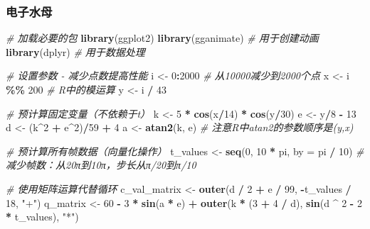 \documentclass[
  twoside]{book}
\newenvironment{Shaded}{\begin{snugshade}}{\end{snugshade}}
\newcommand{\AttributeTok}[1]{\textcolor[rgb]{0.13,0.29,0.53}{#1}}
\newcommand{\CommentTok}[1]{\textcolor[rgb]{0.56,0.35,0.01}{\textit{#1}}}
\newcommand{\DecValTok}[1]{\textcolor[rgb]{0.00,0.00,0.81}{#1}}
\newcommand{\FunctionTok}[1]{\textcolor[rgb]{0.13,0.29,0.53}{\textbf{#1}}}
\newcommand{\NormalTok}[1]{#1}
\newcommand{\OtherTok}[1]{\textcolor[rgb]{0.56,0.35,0.01}{#1}}
\newcommand{\SpecialCharTok}[1]{\textcolor[rgb]{0.81,0.36,0.00}{\textbf{#1}}}
\newcommand{\StringTok}[1]{\textcolor[rgb]{0.31,0.60,0.02}{#1}}
\begin{document}
\hypertarget{ux7535ux5b50ux6c34ux6bcd}{%
\subsubsection{电子水母}\label{ux7535ux5b50ux6c34ux6bcd}}

\begin{Shaded}
\begin{Highlighting}[]
\CommentTok{\# 加载必要的包}
\FunctionTok{library}\NormalTok{(ggplot2)}
\FunctionTok{library}\NormalTok{(gganimate) }\CommentTok{\# 用于创建动画}
\FunctionTok{library}\NormalTok{(dplyr)     }\CommentTok{\# 用于数据处理}

\CommentTok{\# 设置参数 {-} 减少点数提高性能}
\NormalTok{i }\OtherTok{\textless{}{-}} \DecValTok{0}\SpecialCharTok{:}\DecValTok{2000}  \CommentTok{\# 从10000减少到2000个点}
\NormalTok{x }\OtherTok{\textless{}{-}}\NormalTok{ i }\SpecialCharTok{\%\%} \DecValTok{200}      \CommentTok{\# R中的模运算}
\NormalTok{y }\OtherTok{\textless{}{-}}\NormalTok{ i }\SpecialCharTok{/} \DecValTok{43}

\CommentTok{\# 预计算固定变量（不依赖于t）}
\NormalTok{k }\OtherTok{\textless{}{-}} \DecValTok{5} \SpecialCharTok{*} \FunctionTok{cos}\NormalTok{(x}\SpecialCharTok{/}\DecValTok{14}\NormalTok{) }\SpecialCharTok{*} \FunctionTok{cos}\NormalTok{(y}\SpecialCharTok{/}\DecValTok{30}\NormalTok{)}
\NormalTok{e }\OtherTok{\textless{}{-}}\NormalTok{ y}\SpecialCharTok{/}\DecValTok{8} \SpecialCharTok{{-}} \DecValTok{13}
\NormalTok{d }\OtherTok{\textless{}{-}}\NormalTok{ (k}\SpecialCharTok{\^{}}\DecValTok{2} \SpecialCharTok{+}\NormalTok{ e}\SpecialCharTok{\^{}}\DecValTok{2}\NormalTok{)}\SpecialCharTok{/}\DecValTok{59} \SpecialCharTok{+} \DecValTok{4}
\NormalTok{a }\OtherTok{\textless{}{-}} \FunctionTok{atan2}\NormalTok{(k, e)   }\CommentTok{\# 注意R中atan2的参数顺序是(y,x)}

\CommentTok{\# 预计算所有帧数据（向量化操作）}
\NormalTok{t\_values }\OtherTok{\textless{}{-}} \FunctionTok{seq}\NormalTok{(}\DecValTok{0}\NormalTok{, }\DecValTok{10} \SpecialCharTok{*}\NormalTok{ pi, }\AttributeTok{by =}\NormalTok{ pi }\SpecialCharTok{/} \DecValTok{10}\NormalTok{)  }\CommentTok{\# 减少帧数：从20π到10π，步长从π/20到π/10}

\CommentTok{\# 使用矩阵运算代替循环}
\NormalTok{c\_val\_matrix }\OtherTok{\textless{}{-}} \FunctionTok{outer}\NormalTok{(d }\SpecialCharTok{/} \DecValTok{2} \SpecialCharTok{+}\NormalTok{ e }\SpecialCharTok{/} \DecValTok{99}\NormalTok{, }\SpecialCharTok{{-}}\NormalTok{t\_values }\SpecialCharTok{/} \DecValTok{18}\NormalTok{, }\StringTok{"+"}\NormalTok{)}
\NormalTok{q\_matrix }\OtherTok{\textless{}{-}} \DecValTok{60} \SpecialCharTok{{-}} \DecValTok{3} \SpecialCharTok{*} \FunctionTok{sin}\NormalTok{(a }\SpecialCharTok{*}\NormalTok{ e) }\SpecialCharTok{+} \FunctionTok{outer}\NormalTok{(k }\SpecialCharTok{*}\NormalTok{ (}\DecValTok{3} \SpecialCharTok{+} \DecValTok{4} \SpecialCharTok{/}\NormalTok{ d), }\FunctionTok{sin}\NormalTok{(d }\SpecialCharTok{\^{}} \DecValTok{2} \SpecialCharTok{{-}} \DecValTok{2} \SpecialCharTok{*}\NormalTok{ t\_values), }\StringTok{"*"}\NormalTok{)}


\end{Highlighting}
\end{Shaded}
\end{document}
